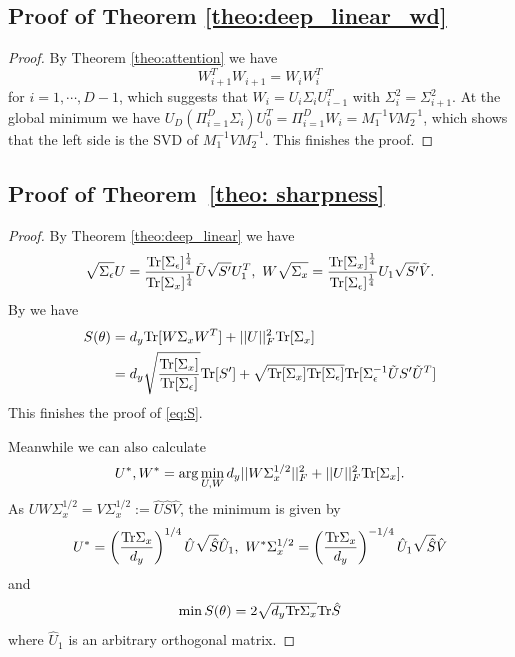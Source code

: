 \documentclass{article}
\theoremstyle{plain}
\newcommand{\Tr}{{\rm Tr}}
\begin{document}
\subsection{Proof of Theorem \ref{theo:deep_linear_wd}}
\begin{proof}
By Theorem \ref{theo:attention} we have
\begin{equation}
W_{i+1}^TW_{i+1}=W_iW_i^T
\end{equation}
for $i=1,\cdots,D-1$, which suggests that $W_i=U_i\Sigma_i U_{i-1}^T$ with $\Sigma_i^2=\Sigma_{i+1}^2$. At the global minimum we have $U_D(\Pi_{i=1}^D\Sigma_i) U_0^T=\Pi_{i=1}^DW_i=M_1^{-1}VM_2^{-1}$, which shows that the left side is the SVD of $M_1^{-1}VM_2^{-1}$. This finishes the proof.
\end{proof}


\subsection{Proof of Theorem~\ref{theo: sharpness}}
\begin{proof}
By Theorem \ref{theo:deep_linear} we have
\begin{equation}
\sqrt{\Sigma_\epsilon} U=\frac{\Tr[\Sigma_\epsilon]^{\frac{1}{4}}}{\Tr[\Sigma_x]^{\frac{1}{4}}}\tilde{U}\sqrt{S'}U_1^T,\ W\sqrt{\Sigma_x}=\frac{\Tr[\Sigma_x]^{\frac{1}{4}}}{\Tr[\Sigma_\epsilon]^{\frac{1}{4}}}U_1\sqrt{S'}\tilde{V}.
\end{equation}
By \cite[Proposition 5.3]{ziyin2025parameter} we have 
\begin{equation}
\begin{aligned}
S(\theta)&=d_y\Tr[W\Sigma_xW^T]+||U||_F^2\Tr[\Sigma_x]\\&=d_y\sqrt{\frac{\Tr[\Sigma_x]}{\Tr[\Sigma_\epsilon]}}\Tr[S']+\sqrt{\Tr[\Sigma_x]\Tr[\Sigma_\epsilon]}\Tr[\Sigma_\epsilon^{-1}\tilde{U}S'\tilde{U}^T]
\end{aligned}
\end{equation}
This finishes the proof of \eqref{eq:S}. 

Meanwhile we can also calculate
\begin{equation}
U^*,W^*=\arg\min_{U,W}d_y||W\Sigma_x^{1/2}||_F^2+||U||_F^2\Tr[\Sigma_x].
\end{equation}
As $UW\Sigma_x^{1/2}=V\Sigma_x^{1/2}:=\hat{U}\hat{S}\hat{V}$, the minimum is given by
\begin{equation}
U^*=\left(\frac{\Tr\Sigma_x}{d_y}\right)^{1/4}\hat{U}\sqrt{\hat{S}}\hat{U}_1,\ W^*\Sigma_x^{1/2}=\left(\frac{\Tr\Sigma_x}{d_y}\right)^{-1/4}\hat{U}_1\sqrt{\hat{S}}\hat{V}
\end{equation}
and
\begin{equation}
\min S(\theta)=2\sqrt{d_y\Tr\Sigma_x}\Tr\hat{S}
\end{equation}
where $\hat{U}_1$ is an arbitrary orthogonal matrix. 
\end{proof}
\end{document}
